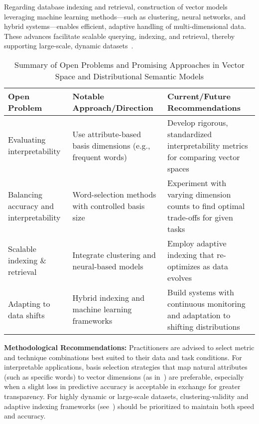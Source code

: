 \documentclass[sigconf]{acmart}
\begin{document}
Regarding database indexing and retrieval, construction of vector models leveraging machine learning methods—such as clustering, neural networks, and hybrid systems—enables efficient, adaptive handling of multi-dimensional data. These advances facilitate scalable querying, indexing, and retrieval, thereby supporting large-scale, dynamic datasets~\cite{ref113}.

\begin{table*}[htbp]
\centering
\caption{Summary of Open Problems and Promising Approaches in Vector Space and Distributional Semantic Models}
\label{tab:openproblems}
\begin{adjustbox}{max width=\textwidth}
\begin{tabular}{@{}lll@{}}
\toprule
Open Problem & Notable Approach/Direction & Current/Future Recommendations \\
\midrule
Evaluating interpretability & Use attribute-based basis dimensions (e.g., frequent words)~\cite{ref115} & Develop rigorous, standardized interpretability metrics for comparing vector spaces \\
Balancing accuracy and interpretability & Word-selection methods with controlled basis size~\cite{ref115} & Experiment with varying dimension counts to find optimal trade-offs for given tasks \\
Scalable indexing \& retrieval & Integrate clustering and neural-based models~\cite{ref113} & Employ adaptive indexing that re-optimizes as data evolves \\
Adapting to data shifts & Hybrid indexing and machine learning frameworks & Build systems with continuous monitoring and adaptation to shifting distributions \\
\bottomrule
\end{tabular}
\end{adjustbox}
\end{table*}

\textbf{Methodological Recommendations:} Practitioners are advised to select metric and technique combinations best suited to their data and task conditions. For interpretable applications, basis selection strategies that map natural attributes (such as specific words) to vector dimensions (as in~\cite{ref115}) are preferable, especially when a slight loss in predictive accuracy is acceptable in exchange for greater transparency. For highly dynamic or large-scale datasets, clustering-validity and adaptive indexing frameworks (see~\cite{ref113}) should be prioritized to maintain both speed and accuracy.
\end{document}
